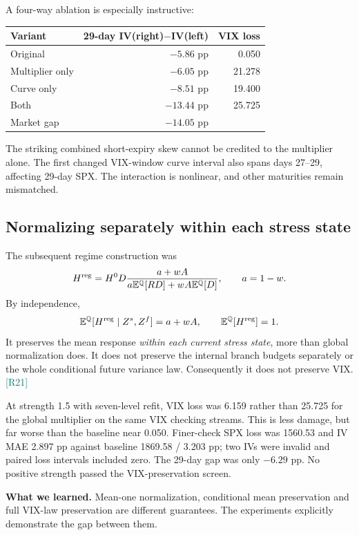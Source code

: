 \documentclass[11pt,a4paper]{article}
\newcommand{\E}{\mathbb E^{\mathbb Q}}
\newcommand{\src}[1]{\textcolor{teal}{\small[#1]}}
\newcommand{\lesson}[1]{\par\smallskip\noindent\colorbox{teal!9}{\parbox{\dimexpr\linewidth-2\fboxsep}{\textbf{What we learned.} #1}}\par\smallskip}
\begin{document}
A four-way ablation is especially instructive:
\begin{center}\begin{tabular}{lrr}\toprule
Variant & 29-day IV(right)$-$IV(left) & VIX loss\\\midrule
Original & $-5.86$ pp & 0.050\\
Multiplier only & $-6.05$ pp & 21.278\\
Curve only & $-8.51$ pp & 19.400\\
Both & $-13.44$ pp & 25.725\\
Market gap & $-14.05$ pp & \\\bottomrule
\end{tabular}\end{center}
The striking combined short-expiry skew cannot be credited to the multiplier alone. The first changed VIX-window curve interval also spans days 27--29, affecting 29-day SPX. The interaction is nonlinear, and other maturities remain mismatched.

\subsection{Normalizing separately within each stress state}
The subsequent regime construction was
\begin{equation}
H^{\rm reg}=H^0D\frac{a+wA}{a\E[RD]+wA\E[D]},\qquad a=1-w.
\end{equation}
By independence,
\begin{equation}
\E[H^{\rm reg}\mid Z^s,Z^f]=a+wA,\qquad \E[H^{\rm reg}]=1.
\end{equation}
It preserves the mean response \emph{within each current stress state}, more than global normalization does. It does not preserve the internal branch budgets separately or the whole conditional future variance law. Consequently it does not preserve VIX. \src{R21}

At strength 1.5 with seven-level refit, VIX loss was 6.159 rather than 25.725 for the global multiplier on the same VIX checking streams. This is less damage, but far worse than the baseline near 0.050. Finer-check SPX loss was 1560.53 and IV MAE 2.897 pp against baseline 1869.58 / 3.203 pp; two IVs were invalid and paired loss intervals included zero. The 29-day gap was only $-6.29$ pp. No positive strength passed the VIX-preservation screen.

\lesson{Mean-one normalization, conditional mean preservation and full VIX-law preservation are different guarantees. The experiments explicitly demonstrate the gap between them.}
\end{document}
